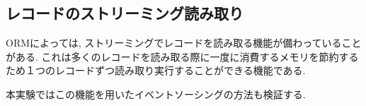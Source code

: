 \documentclass[../../../main]{subfiles}
\begin{document}
    \subsection{レコードのストリーミング読み取り}\label{subsec:phraseology-record_streaming_read}

    ORMによっては, ストリーミングでレコードを読み取る機能が備わっていることがある. これは多くのレコードを読み取る際に一度に消費するメモリを節約するため１つのレコードずつ読み取り実行することができる機能である.

    本実験ではこの機能を用いたイベントソーシングの方法も検証する.
\end{document}
